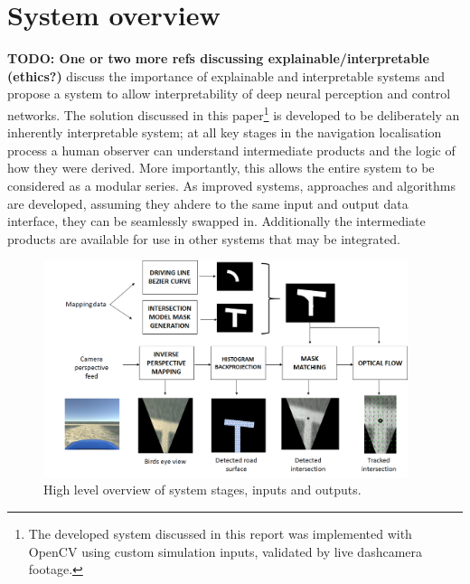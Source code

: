 \documentclass[]{aiaa-tc}%
\begin{document}
%

\section{System overview}
\textbf{TODO: One or two more refs discussing explainable/interpretable (ethics?)}
\citep{explainableCNNBookChapter} discuss the importance of explainable and interpretable systems and propose a system to allow interpretability of deep neural perception and control networks. The solution discussed in this paper\footnote{The developed system discussed in this report was implemented with OpenCV using custom simulation inputs, validated by live dashcamera footage.} is developed to be deliberately an inherently interpretable system; at all key stages in the navigation localisation process a human observer can understand intermediate products and the logic of how they were derived.  More importantly, this allows the entire system to be considered as a modular series. As improved systems, approaches and algorithms are developed, assuming they ahdere to the same input and output data interface, they can be seamlessly swapped in. Additionally the intermediate products are available for use in other systems that may be integrated.

\begin{figure}
	\centering
	\includegraphics[width=0.95\textwidth]{systemOverview.png}
	\caption{High level overview of system stages, inputs and outputs.}
	\label{f:systemOverview}
\end{figure}
\end{document}
